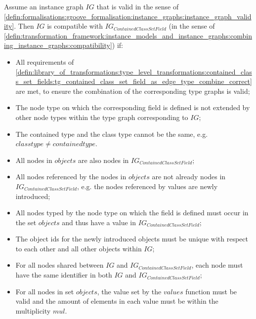 \begin{thm}
\label{defin:library_of_transformations:instance_level_transformations:contained_class_set_field_values:ig_contained_class_set_field_as_edge_type_combine_correct}
Assume an instance graph $IG$ that is valid in the sense of \cref{defin:formalisations:groove_formalisation:instance_graphs:instance_graph_validity}. Then $IG$ is compatible with $IG_{ContainedClassSetField}$ (in the sense of \cref{defin:transformation_framework:instance_models_and_instance_graphs:combining_instance_graphs:compatibility}) if:
\begin{itemize}
    \item All requirements of \cref{defin:library_of_transformations:type_level_transformations:contained_class_set_fields:tg_contained_class_set_field_as_edge_type_combine_correct} are met, to ensure the combination of the corresponding type graphs is valid;
    \item The node type on which the corresponding field is defined is not extended by other node types within the type graph corresponding to $IG$;
    \item The contained type and the class type cannot be the same, e.g. $classtype \neq containedtype$.
    \item All nodes in $objects$ are also nodes in $IG_{ContainedClassSetField}$;
    \item All nodes referenced by the nodes in $objects$ are not already nodes in $IG_{ContainedClassSetField}$, e.g. the nodes referenced by values are newly introduced;
    \item All nodes typed by the node type on which the field is defined must occur in the set $objects$ and thus have a value in $IG_{ContainedClassSetField}$;
    \item The object ids for the newly introduced objects must be unique with respect to each other and all other objects within $IG$;
    \item For all nodes shared between $IG$ and $IG_{ContainedClassSetField}$, each node must have the same identifier in both $IG$ and $IG_{ContainedClassSetField}$;
    \item For all nodes in set $objects$, the value set by the $values$ function must be valid and the amount of elements in each value must be within the multiplicity $mul$.
\end{itemize}
\end{thm}

